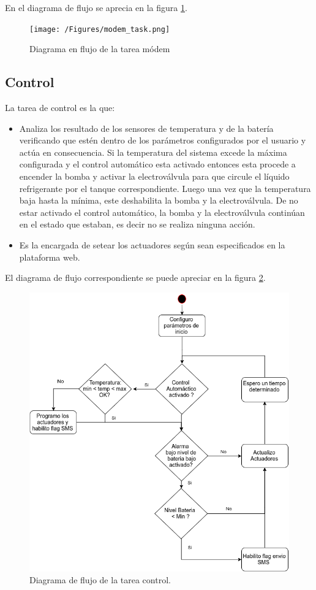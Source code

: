   En el diagrama de flujo se aprecia en la figura \ref{fig:modem_task}.

  \begin{figure}[!htp]
    \texttt{[image: /Figures/modem\_task.png]}
    \caption{Diagrama en flujo de la tarea módem}
    \label{fig:modem_task}
\end{figure}


\subsection*{Control}
La tarea de control es la que:
  
\begin{itemize}
  \item Analiza los resultado de los sensores de temperatura y de la batería verificando que estén dentro de los parámetros configurados por el usuario y actúa en consecuencia. Si la temperatura del sistema excede la máxima configurada y el control automático esta activado entonces esta procede a encender la bomba y activar la electroválvula para que circule el líquido refrigerante por el tanque correspondiente. Luego una vez que la temperatura baja hasta la mínima, este deshabilita la bomba y la electroválvula. De no estar activado el control automático, la bomba y la electroválvula continúan en el estado que estaban, es decir no se realiza ninguna acción.
  \item Es la encargada de setear los actuadores según sean especificados en la plataforma web.
\end{itemize}

El diagrama de flujo correspondiente se puede apreciar en la figura \ref{fig:control_task}.
\begin{figure}[hp]
  \includegraphics[scale=.5]{./Figures/control_task.png}
  \caption{Diagrama de flujo de la tarea control.}
  \label{fig:control_task}
\end{figure}


